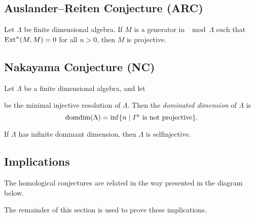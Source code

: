 \subsection*{Auslander--Reiten Conjecture (ARC)}

\begin{conj} 
	Let $\Lambda$ be  finite dimensional algebra. If $M$ is a generator in $\mod\Lambda$ such that  $\operatorname{Ext}^n(M, M) = 0$ for all $n > 0$, then $M$ is projective. 
\end{conj}

\subsection*{Nakayama Conjecture (NC)}

\begin{defn}
	Let $\Lambda$ be a finite dimensional algebra, and let
	\begin{center}
	\end{center}
	be the minimal injective resolution of $\Lambda$. Then the \emph{dominated dimension} of $\Lambda$ is $$\operatorname{domdim}(\Lambda) = \inf\{n \; | \; I^n\text{ is not projective} \}.$$
\end{defn}

\begin{conj} 
	If $\Lambda$ has infinite dominant dimension, then $\Lambda$ is selfinjective.
\end{conj}

\subsection{Implications}
The homological conjectures are related in the way presented in the diagram below.


The remainder of this section is used to prove these implications.

